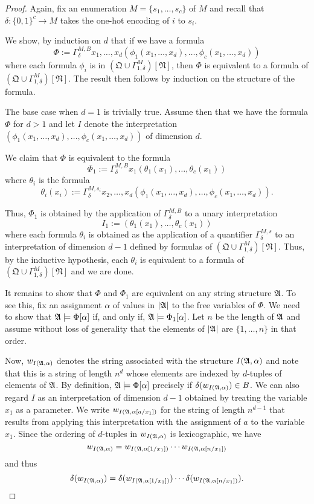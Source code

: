 \documentclass[a4paper,UKenglish,cleveref, autoref, thm-restate, anonymous]{lipics-v2021}
\begin{document}
  \begin{proof}
Again, fix an enumeration $M = \{s_1,\ldots,s_c\}$ of $M$ and recall that $\delta : \{0,1\}^c \rightarrow M$ takes the one-hot encoding of $i$ to $s_i$.
    
    We show, by induction on $d$ that if we have a formula
    \[ \Phi := \Gamma^{M,B}_{\delta} x_1,\ldots,x_d (\phi_1(x_1,\ldots,x_d),\ldots,\phi_c(x_1,\ldots,x_d)) \]
 where each formula $\phi_i$ is in $(\mathfrak{Q}  \cup \Gamma^{M}_{1,\delta})[\mathfrak{N}]$, then $\Phi$  is equivalent to a formula of $(\mathfrak{Q}  \cup \Gamma^{M}_{1,\delta})[\mathfrak{N}]$.  The result then follows by induction on the structure of the formula.

    The base case when $d=1$ is trivially true.  Assume then that we have the formula $\Phi$ for $d > 1$ and let $I$ denote the interpretation $(\phi_1(x_1,\ldots,x_d),\ldots,\phi_c(x_1,\ldots,x_d))$ of dimension $d$.

    We claim that $\Phi$ is equivalent to the formula
    \[ \Phi_1 := \Gamma_{\delta}^{M,B} x_1  (\theta_1(x_1),\ldots,\theta_c(x_1)) \]
    where $\theta_i$ is the formula
    \[ \theta_i(x_i) := \Gamma_{\delta}^{M,s_i}x_2,\ldots,x_d (\phi_1(x_1,\ldots,x_d),\ldots,\phi_c(x_1,\ldots,x_d)).\]

    Thus, $\Phi_1$ is obtained by the application of $ \Gamma_{\delta}^{M,B}$ to a unary interpretation $$I_1 := (\theta_1(x_1),\ldots,\theta_c(x_1))$$ where each formula $\theta_i$ is obtained as the application of a quantifier $ \Gamma_{\delta}^{M,s}$ to an interpretation of dimension $d-1$ defined by formulas of $(\mathfrak{Q} \cup \Gamma^{M}_{1,\delta})[\mathfrak{N}]$.  Thus, by the inductive hypothesis, each $\theta_i$ is equivalent to a formula of $(\mathfrak{Q}  \cup \Gamma^{M}_{1,\delta})[\mathfrak{N}]$ and we are done.

      It remains to show that $\Phi$ and $\Phi_1$ are equivalent on any string structure $\mathfrak{A}$.  To see this, fix an assignment $\alpha$ of values in $|\mathfrak{A}|$ to the free variables of $\Phi$.  We need to show that $\mathfrak{A} \models \Phi[\alpha]$ if, and only if, $\mathfrak{A} \models \Phi_1[\alpha]$.  Let $n$ be the length of $\mathfrak{A}$ and assume without loss of generality that the elements of $|\mathfrak{A}|$ are $\{1,\ldots,n\}$ in that order.

      Now, $w_{I(\mathfrak{A},\alpha)}$ denotes the string associated with the structure $I(\mathfrak{A},\alpha)$ and note that this is a string of length $n^d$ whose elements are indexed by $d$-tuples of elements of $\mathfrak{A}$.  By definition, $\mathfrak{A} \models \Phi[\alpha]$ precisely if $\delta(w_{I(\mathfrak{A},\alpha)}) \in B$.  We can also regard $I$ as an interpretation of dimension $d-1$ obtained by treating the variable $x_1$ as a parameter.  We write $w_{I(\mathfrak{A},\alpha[a/x_1])}$ for the string of length $n^{d-1}$ that results from applying this interpretation with the assignment of $a$ to the variable $x_1$.  Since the ordering of $d$-tuples in $w_{I(\mathfrak{A},\alpha)}$ is lexicographic, we have
\[
        w_{I(\mathfrak{A},\alpha)} = w_{I(\mathfrak{A},\alpha[1/x_1])}\cdots w_{I(\mathfrak{A},\alpha[n/x_1])}
\]
      and thus
\[
        \delta(w_{I(\mathfrak{A},\alpha)}) = \delta(w_{I(\mathfrak{A},\alpha[1/x_1])})\cdots \delta(w_{I(\mathfrak{A},\alpha[n/x_1])}).
\]


\end{proof}
\end{document}
